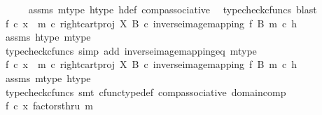 \begin{isabellebody}
\ \ \ \ \isamarkupfalse%
\ assms\ m{\isacharunderscore}{\kern0pt}type\ h{\isacharunderscore}{\kern0pt}type\ h{\isacharunderscore}{\kern0pt}def\ comp{\isacharunderscore}{\kern0pt}associative{}\ \isamarkupfalse%
\ {\isacharparenleft}{\kern0pt}typecheck{\isacharunderscore}{\kern0pt}cfuncs{\isacharcomma}{\kern0pt}\ blast{\isacharparenright}{\kern0pt}\isanewline
\ \ \isamarkupfalse%
\ \isamarkupfalse%
\ {\isachardoublequoteopen}f\ {\isasymcirc}\isactrlsub c\ x\ {\isacharequal}{\kern0pt}\ {\isacharparenleft}{\kern0pt}m\ {\isasymcirc}\isactrlsub c\ right{\isacharunderscore}{\kern0pt}cart{\isacharunderscore}{\kern0pt}proj\ X\ B\ {\isasymcirc}\isactrlsub c\ inverse{\isacharunderscore}{\kern0pt}image{\isacharunderscore}{\kern0pt}mapping\ f\ B\ m{\isacharparenright}{\kern0pt}\ {\isasymcirc}\isactrlsub c\ h{\isachardoublequoteclose}\isanewline
\ \ \ \ \isamarkupfalse%
\ assms\ h{\isacharunderscore}{\kern0pt}type\ m{\isacharunderscore}{\kern0pt}type\ \isamarkupfalse%
\ {\isacharparenleft}{\kern0pt}typecheck{\isacharunderscore}{\kern0pt}cfuncs{\isacharcomma}{\kern0pt}\ simp\ add{\isacharcolon}{\kern0pt}\ inverse{\isacharunderscore}{\kern0pt}image{\isacharunderscore}{\kern0pt}mapping{\isacharunderscore}{\kern0pt}eq\ m{\isacharunderscore}{\kern0pt}type{\isacharparenright}{\kern0pt}\isanewline
\ \ \isamarkupfalse%
\ \isamarkupfalse%
\ {\isachardoublequoteopen}f\ {\isasymcirc}\isactrlsub c\ x\ {\isacharequal}{\kern0pt}\ m\ {\isasymcirc}\isactrlsub c\ right{\isacharunderscore}{\kern0pt}cart{\isacharunderscore}{\kern0pt}proj\ X\ B\ {\isasymcirc}\isactrlsub c\ inverse{\isacharunderscore}{\kern0pt}image{\isacharunderscore}{\kern0pt}mapping\ f\ B\ m\ {\isasymcirc}\isactrlsub c\ h{\isachardoublequoteclose}\isanewline
\ \ \ \ \isamarkupfalse%
\ assms\ m{\isacharunderscore}{\kern0pt}type\ h{\isacharunderscore}{\kern0pt}type\ \isamarkupfalse%
\ {\isacharparenleft}{\kern0pt}typecheck{\isacharunderscore}{\kern0pt}cfuncs{\isacharcomma}{\kern0pt}\ smt\ cfunc{\isacharunderscore}{\kern0pt}type{\isacharunderscore}{\kern0pt}def\ comp{\isacharunderscore}{\kern0pt}associative\ domain{\isacharunderscore}{\kern0pt}comp{\isacharparenright}{\kern0pt}\isanewline
\ \ \isamarkupfalse%
\ \isamarkupfalse%
\ {\isachardoublequoteopen}{\isacharparenleft}{\kern0pt}f\ {\isasymcirc}\isactrlsub c\ x{\isacharparenright}{\kern0pt}\ factorsthru\ m{\isachardoublequoteclose}\isanewline
\ \ \ \ \isamarkupfalse%

\end{isabellebody}
